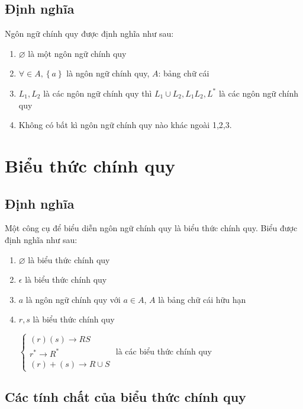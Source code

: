 \documentclass[14pt]{extreport}
\begin{document}
\subsection{Định nghĩa}

Ngôn ngữ chính quy được định nghĩa như sau:

\begin{enumerate}
\item $\varnothing$ là một ngôn ngữ chính quy
\item $\forall \in A,\left\{a\right\}$ là ngôn ngữ chính quy, $A$: bảng chữ cái
\item $L_1,L_2$ là các ngôn ngữ chính quy thì $L_1 \cup L_2,L_1L_2,L^*$ là các ngôn ngữ chính quy
\item Không có bất kì ngôn ngữ chính quy nào khác ngoài 1,2,3.
\end{enumerate}

\section{Biểu thức chính quy}
\subsection{Định nghĩa}

Một công cụ để biểu diễn ngôn ngữ chính quy là biểu thức chính quy. Biểu được định nghĩa như sau:

\begin{enumerate}
\item $\varnothing$ là biểu thức chính quy
\item $\epsilon$ là biểu thức chính quy
\item $a$ là ngôn ngữ chính quy với $a \in A$, $A$ là bảng chữ cái hữu hạn
\item $r,s$ là biểu thức chính quy

$\left\{\begin{matrix}
(r)(s)\rightarrow RS\\ 
r^{*}\rightarrow R^{*}
\\ (r)+(s)\rightarrow R\cup S

\end{matrix}\right.$ là các biểu thức chính quy
\end{enumerate}
\subsection{Các tính chất của biểu thức chính quy}
\end{document}
